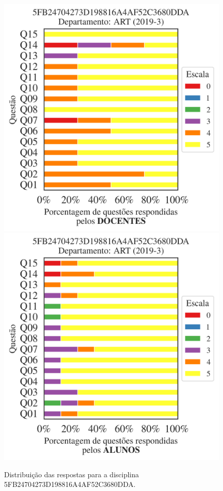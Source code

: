 \documentclass[a4paper,10pt]{article}
\begin{document}
\begin{figure}[h]
\centering
\includegraphics[width=0.485\linewidth]{analise_disciplina_departamento_ART_5FB24704273D198816A4AF52C3680DDA_docentes.png}
\includegraphics[width=0.485\linewidth]{analise_disciplina_departamento_ART_5FB24704273D198816A4AF52C3680DDA_alunos.png}
\caption{\label{fig:analise_geral_departamento}                Distribuição das respostas para a disciplina 5FB24704273D198816A4AF52C3680DDA. }
\end{figure}
\end{document}
